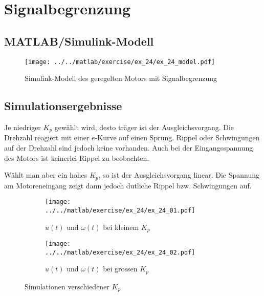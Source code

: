 \section{Signalbegrenzung}

\subsection{MATLAB/Simulink-Modell}

\begin{figure}[h!]
	\centering
	\texttt{[image: ../../matlab/exercise/ex\_24/ex\_24\_model.pdf]}
	\caption{Simulink-Modell des geregelten Motors mit Signalbegrenzung}
\end{figure}

\subsection{Simulationsergebnisse}
Je niedriger $K_p$ gewählt wird, desto träger ist der Ausgleichsvorgang.
Die Drehzahl reagiert mit einer $e$-Kurve auf einen Sprung. Rippel oder
Schwingungen auf der Drehzahl sind jedoch keine vorhanden. Auch bei der
Eingangsspannung des Motors ist keinerlei Rippel zu beobachten.

Wählt man aber ein hohes $K_p$, so ist der Ausgleichsvorgang linear. Die
Spannung am Motoreneingang zeigt dann jedoch dutliche Rippel bzw.
Schwingungen auf.

\begin{figure}[h!]
	\centering
	\begin{subfigure}{0.45\textwidth}
		\texttt{[image: ../../matlab/exercise/ex\_24/ex\_24\_01.pdf]}
		\caption{$u(t)$ und $\omega(t)$ bei kleinem $K_p$}
	\end{subfigure}
	\hfill{}
	\begin{subfigure}{0.45\textwidth}
		\texttt{[image: ../../matlab/exercise/ex\_24/ex\_24\_02.pdf]}
		\caption{$u(t)$ und $\omega(t)$ bei grossen $K_p$}
	\end{subfigure}
	\caption{Simulationen verschiedener $K_p$}
\end{figure}
